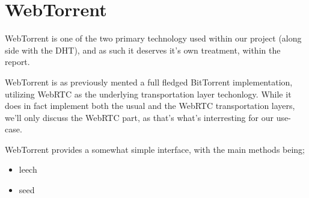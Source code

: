 \section{WebTorrent}

WebTorrent is one of the two primary technology used within our project (along 
side with the \acs{DHT}), and as such it deserves it's own treatment, within the 
report.

WebTorrent is as previously mented a full fledged BitTorrent implementation, 
utilizing WebRTC as the underlying transportation layer techonlogy. While it 
does in fact implement both the usual and the WebRTC transportation layers,
we'll only discuss the WebRTC part, as that's what's interresting for our
use-case.

WebTorrent provides a somewhat simple interface, with the main methods being;
\begin{itemize}
\item leech
\item seed
\end{itemize}

